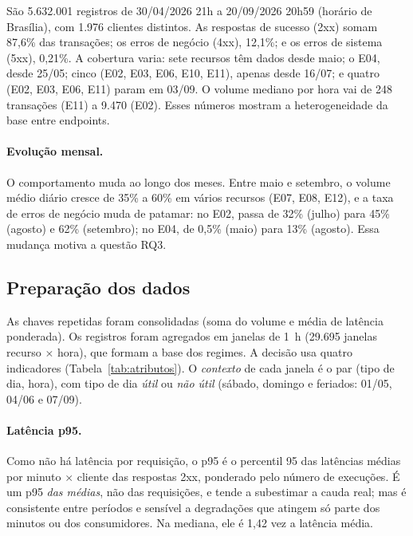 \documentclass[sigconf,nonacm]{acmart}
\begin{document}
São 5.632.001 registros de 30/04/2026 21h a 20/09/2026 20h59 (horário de Brasília), com 1.976 clientes distintos. As respostas de sucesso (2xx) somam 87,6\% das transações; os erros de negócio (4xx), 12,1\%; e os erros de sistema (5xx), 0,21\%. A cobertura varia: sete recursos têm dados desde maio; o E04, desde 25/05; cinco (E02, E03, E06, E10, E11), apenas desde 16/07; e quatro (E02, E03, E06, E11) param em 03/09. O volume mediano por hora vai de 248 transações (E11) a 9.470 (E02). Esses números mostram a heterogeneidade da base entre endpoints.

\paragraph{Evolução mensal.} O comportamento muda ao longo dos meses. Entre maio e setembro, o volume médio diário cresce de 35\% a 60\% em vários recursos (E07, E08, E12), e a taxa de erros de negócio muda de patamar: no E02, passa de 32\% (julho) para 45\% (agosto) e 62\% (setembro); no E04, de 0,5\% (maio) para 13\% (agosto). Essa mudança motiva a questão RQ3.

\subsection{Preparação dos dados}
As chaves repetidas foram consolidadas (soma do volume e média de latência ponderada). Os registros foram agregados em janelas de 1~h (29.695 janelas recurso $\times$ hora), que formam a base dos regimes. A decisão usa quatro indicadores (Tabela~\ref{tab:atributos}). O \emph{contexto} de cada janela é o par (tipo de dia, hora), com tipo de dia \emph{útil} ou \emph{não útil} (sábado, domingo e feriados: 01/05, 04/06 e 07/09).

\paragraph{Latência p95.} Como não há latência por requisição, o p95 é o percentil 95 das latências médias por minuto $\times$ cliente das respostas 2xx, ponderado pelo número de execuções. É um p95 \emph{das médias}, não das requisições, e tende a subestimar a cauda real; mas é consistente entre períodos e sensível a degradações que atingem só parte dos minutos ou dos consumidores. Na mediana, ele é 1,42 vez a latência média.
\end{document}
